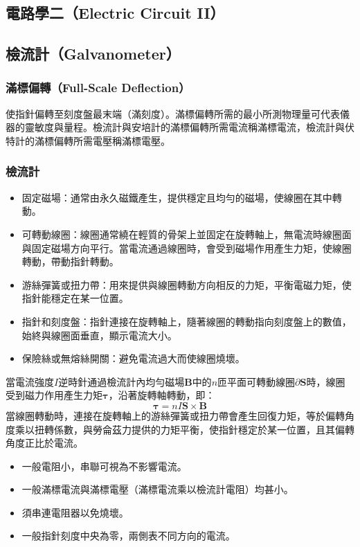 \documentclass[a4paper,12pt]{report}
\begin{document}
\begin{itemize}
\section{電路學二（Electric Circuit II）}
\subsection{檢流計（Galvanometer）}
\subsubsection{滿標偏轉（Full-Scale Deflection）}
使指針偏轉至刻度盤最末端（滿刻度）。滿標偏轉所需的最小所測物理量可代表儀器的靈敏度與量程。檢流計與安培計的滿標偏轉所需電流稱滿標電流，檢流計與伏特計的滿標偏轉所需電壓稱滿標電壓。
\subsubsection{檢流計}
\begin{itemize}
\item 固定磁場：通常由永久磁鐵產生，提供穩定且均勻的磁場，使線圈在其中轉動。
\item 可轉動線圈：線圈通常繞在輕質的骨架上並固定在旋轉軸上，無電流時線圈面與固定磁場方向平行。當電流通過線圈時，會受到磁場作用產生力矩，使線圈轉動，帶動指針轉動。
\item 游絲彈簧或扭力帶：用來提供與線圈轉動方向相反的力矩，平衡電磁力矩，使指針能穩定在某一位置。
\item 指針和刻度盤：指針連接在旋轉軸上，隨著線圈的轉動指向刻度盤上的數值，始終與線圈面垂直，顯示電流大小。
\item 保險絲或無熔絲開關：避免電流過大而使線圈燒壞。
\end{itemize}
當電流強度$I$逆時針通過檢流計內均勻磁場$\mathbf{B}$中的$n$匝平面可轉動線圈$\partial\mathbf{S}$時，線圈受到磁力作用產生力矩$\boldsymbol{\tau}$，沿著旋轉軸轉動，即：
\[\boldsymbol{\tau} = nI\mathbf{S}\times\mathbf{B}\]
當線圈轉動時，連接在旋轉軸上的游絲彈簧或扭力帶會產生回復力矩，等於偏轉角度乘以扭轉係數，與勞侖茲力提供的力矩平衡，使指針穩定於某一位置，且其偏轉角度正比於電流。
\begin{itemize}
\item 一般電阻小，串聯可視為不影響電流。
\item 一般滿標電流與滿標電壓（滿標電流乘以檢流計電阻）均甚小。
\item 須串連電阻器以免燒壞。
\item 一般指針刻度中央為零，兩側表不同方向的電流。
\end{itemize}

\end{itemize}
\end{document}
